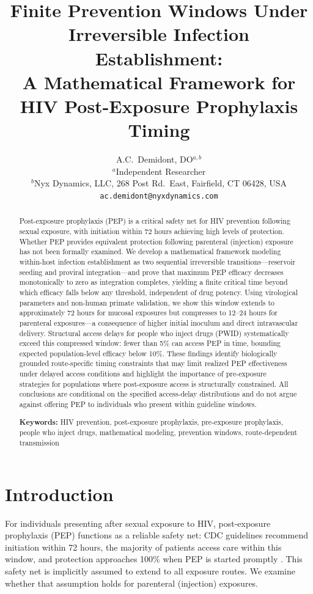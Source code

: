 \documentclass[12pt,a4paper]{article}
\title{Finite Prevention Windows Under Irreversible Infection Establishment:\\
A Mathematical Framework for HIV Post-Exposure Prophylaxis Timing}
\author{A.C.\ Demidont, DO$^{a,b}$\\[4pt]
\small $^{a}$Independent Researcher\\
\small $^{b}$Nyx Dynamics, LLC, 268 Post Rd.\ East, Fairfield, CT 06428, USA\\
\small \texttt{ac.demidont@nyxdynamics.com}}
\date{}
\theoremstyle{plain}
\theoremstyle{definition}
\theoremstyle{remark}
\begin{document}
\maketitle

\begin{abstract}
Post-exposure prophylaxis (PEP) is a critical safety net for HIV prevention following sexual exposure, with initiation within 72 hours achieving high levels of protection. Whether PEP provides equivalent protection following parenteral (injection) exposure has not been formally examined. We develop a mathematical framework modeling within-host infection establishment as two sequential irreversible transitions---reservoir seeding and proviral integration---and prove that maximum PEP efficacy decreases monotonically to zero as integration completes, yielding a finite critical time beyond which efficacy falls below any threshold, independent of drug potency. Using virological parameters and non-human primate validation, we show this window extends to approximately 72 hours for mucosal exposures but compresses to 12--24 hours for parenteral exposures---a consequence of higher initial inoculum and direct intravascular delivery. Structural access delays for people who inject drugs (PWID) systematically exceed this compressed window: fewer than 5\% can access PEP in time, bounding expected population-level efficacy below 10\%. These findings identify biologically grounded route-specific timing constraints that may limit realized PEP effectiveness under delayed access conditions and highlight the importance of pre-exposure strategies for populations where post-exposure access is structurally constrained. All conclusions are conditional on the specified access-delay distributions and do not argue against offering PEP to individuals who present within guideline windows.

\medskip
\noindent\textbf{Keywords:} HIV prevention, post-exposure prophylaxis, pre-exposure prophylaxis, people who inject drugs, mathematical modeling, prevention windows, route-dependent transmission
\end{abstract}


\section{Introduction}\label{sec:intro}

For individuals presenting after sexual exposure to HIV, post-exposure prophylaxis (PEP) functions as a reliable safety net: CDC guidelines recommend initiation within 72 hours, the majority of patients access care within this window, and protection approaches 100\% when PEP is started promptly \citep{ref:Tanner2025}. This safety net is implicitly assumed to extend to all exposure routes. We examine whether that assumption holds for parenteral (injection) exposures.
\end{document}
